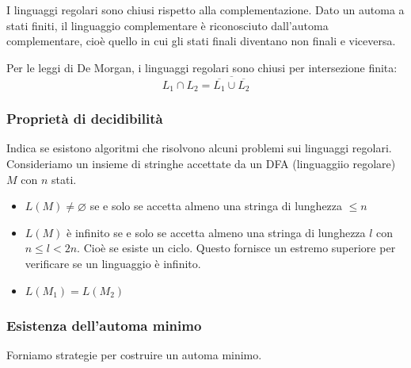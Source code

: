 \documentclass[a4paper]{article}
\begin{document}
\begin{theorem}
  I linguaggi regolari sono chiusi rispetto alla complementazione. Dato un automa
  a stati finiti, il linguaggio complementare è riconosciuto dall'automa complementare,
  cioè quello in cui gli stati finali diventano non finali e viceversa.

  \vspace{1em}
  \noindent
  Per le leggi di De Morgan, i linguaggi regolari sono chiusi per intersezione finita:
  \[
    L_1 \cap L_2 = \overline{\overline{L_1} \cup \overline{L_2}}
  \] 
\end{theorem}


\subsubsection{Proprietà di decidibilità}
Indica se esistono algoritmi che risolvono alcuni problemi sui linguaggi regolari.
Consideriamo un insieme di stringhe accettate da un DFA (linguaggiio regolare) \( M \) 
con \( n \) stati.
\begin{itemize}
  \item \( L(M) \neq \varnothing \) se e solo se accetta almeno una stringa di lunghezza \( \le n \) 

  \item \( L(M) \) è infinito se e solo se accetta almeno una stringa di lunghezza
    \( l \) con \( n \le l < 2n \). Cioè se esiste un ciclo. Questo fornisce un estremo
    superiore per verificare se un linguaggio è infinito.

  \item \( L(M_1) = L(M_2) \) 
\end{itemize}


\subsubsection{Esistenza dell'automa minimo}
Forniamo strategie per costruire un automa minimo.
\end{document}

